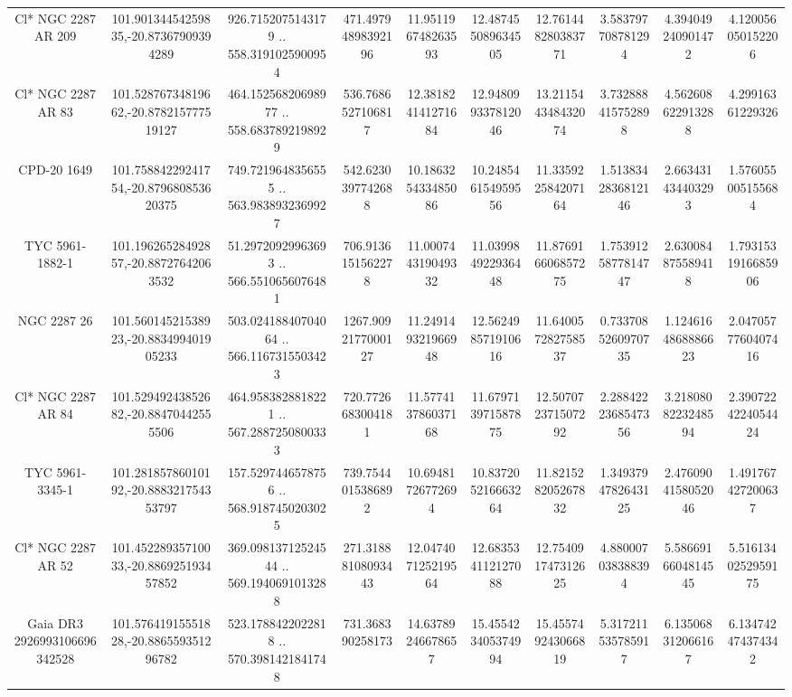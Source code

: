 \begin{table}
\begin{tabular}{cccccccccc}
Cl* NGC 2287     AR     209 & 101.90134454259835,-20.87367909394289 & 926.7152075143179 .. 558.3191025900954 & 471.49794898392196 & 11.951196748263593 & 12.487455089634505 & 12.761448280383771 & 3.583797708781294 & 4.394049240901472 & 4.120056050152206 \\
Cl* NGC 2287     AR      83 & 101.52876734819662,-20.878215777519127 & 464.15256820698977 .. 558.6837892198929 & 536.7686527106817 & 12.381824141271684 & 12.948099337812046 & 13.211544348432074 & 3.732888415752898 & 4.562608622913288 & 4.29916361229326 \\
CPD-20  1649 & 101.75884229241754,-20.879680853620375 & 749.7219648356555 .. 563.9838932369927 & 542.6230397742688 & 10.186325433485086 & 10.248546154959556 & 11.335922584207164 & 1.5138342836812146 & 2.663431434403293 & 1.576055005155684 \\
TYC 5961-1882-1 & 101.19626528492857,-20.88727642063532 & 51.29720929963693 .. 566.5510656076481 & 706.9136151562278 & 11.000744319049332 & 11.039984922936448 & 11.876916606857275 & 1.7539125877814747 & 2.630084875589418 & 1.7931531916685906 \\
NGC  2287    26 & 101.56014521538923,-20.883499401905233 & 503.02418840704064 .. 566.1167315503423 & 1267.9092177000127 & 11.249149321966948 & 12.562498571910616 & 11.640057282758537 & 0.7337085260970735 & 1.1246164868886623 & 2.0470577760407416 \\
Cl* NGC 2287     AR      84 & 101.52949243852682,-20.88470442555506 & 464.9583828818221 .. 567.2887250800333 & 720.7726683004181 & 11.577413786037168 & 11.679713971587875 & 12.507072371507292 & 2.2884222368547356 & 3.2180808223248594 & 2.3907224224054424 \\
TYC 5961-3345-1 & 101.28185786010192,-20.888321754353797 & 157.5297446578756 .. 568.9187450203025 & 739.7544015386892 & 10.69481726772694 & 10.837205216663264 & 11.821528205267832 & 1.3493794782643125 & 2.4760904158052046 & 1.491767427200637 \\
Cl* NGC 2287     AR      52 & 101.45228935710033,-20.886925193457852 & 369.09813712524544 .. 569.1940691013288 & 271.31888108093443 & 12.047407125219564 & 12.683534112127088 & 12.754091747312625 & 4.880007038388394 & 5.5866916604814545 & 5.5161340252959175 \\
Gaia DR3 2926993106696342528 & 101.57641915551828,-20.886559351296782 & 523.1788422022818 .. 570.3981421841748 & 731.368390258173 & 14.63789246678657 & 15.455423405374994 & 15.455749243066819 & 5.317211535785917 & 6.135068312066167 & 6.134742474374342 \\

\end{tabular}
\end{table}
